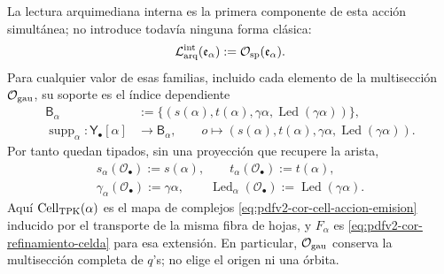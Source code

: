 La lectura arquimediana interna es la primera componente de esta acción
simultánea; no introduce todavía ninguna forma clásica:
\begin{equation}
\label{pII-full:eq:continuo-lector-arquimediano}
 \mathcal L_{\rm arq}^{\rm int}(\mathfrak e_\alpha)
 :=\mathcal O_{\rm sp}(\mathfrak e_\alpha).
\end{equation}
Para cualquier valor de esas familias, incluido cada elemento de la
multisección \(\mathcal O_{\rm gau}\), su soporte es el índice dependiente
\begin{equation}
\label{eq:pdfv2-cor-soporte-dependiente}
 \begin{aligned}
 \mathsf B_\alpha&:=
 \{(s(\alpha),t(\alpha),\gamma\alpha,
          \operatorname{Led}(\gamma\alpha))\},\\
 \operatorname{supp}_\alpha:\mathsf Y_\bullet[\alpha]&\longrightarrow
 \mathsf B_\alpha,\qquad
 o\longmapsto(s(\alpha),t(\alpha),\gamma\alpha,
          \operatorname{Led}(\gamma\alpha)).
 \end{aligned}
\end{equation}
Por tanto quedan tipados, sin una proyección que recupere la arista,
\begin{equation}
\label{eq:pdfv2-cor-soporte-cinco-lecturas}
 \begin{gathered}
 s_\alpha(\mathcal O_\bullet):=s(\alpha),\qquad
 t_\alpha(\mathcal O_\bullet):=t(\alpha),\\
 \gamma_\alpha(\mathcal O_\bullet):=\gamma\alpha,
 \qquad
 \operatorname{Led}_\alpha(\mathcal O_\bullet)
 :=\operatorname{Led}(\gamma\alpha).
 \end{gathered}
\end{equation}
Aquí \(\operatorname{Cell}_{\rm TPK}(\alpha)\) es el mapa de complejos
\eqref{eq:pdfv2-cor-cell-accion-emision} inducido por el transporte de la
misma fibra de hojas, y \(F_\alpha\) es
\eqref{eq:pdfv2-cor-refinamiento-celda} para esa extensión. En particular,
\(\mathcal O_{\rm gau}\) conserva la multisección completa de \(q\)'s; no
elige el origen ni una órbita.

